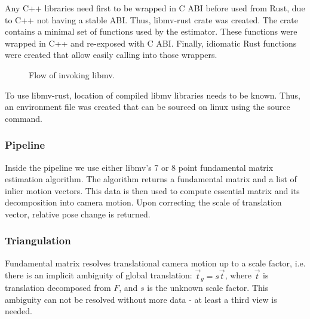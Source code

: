 \documentclass[11pt,english]{report}
\begin{document}
Any C++ libraries need first to be wrapped in C ABI before used from Rust, due to C++ not having a stable ABI. Thus, libmv-rust crate was created. The crate contains a minimal set of functions used by the estimator. These functions were wrapped in C++ and re-exposed with C ABI. Finally, idiomatic Rust functions were created that allow easily calling into those wrappers.

\begin{figure}[!ht]
	\centering
	\caption{\centering Flow of invoking libmv.}
\end{figure}

To use libmv-rust, location of compiled libmv libraries needs to be known. Thus, an environment file was created that can be sourced on linux using the source command.

\subsubsection{Pipeline}

Inside the pipeline we use either libmv's 7 or 8 point fundamental matrix estimation algorithm. The algorithm returns a fundamental matrix and a list of inlier motion vectors. This data is then used to compute essential matrix and its decomposition into camera motion. Upon correcting the scale of translation vector, relative pose change is returned.

\subsubsection{Triangulation}

Fundamental matrix resolves translational camera motion up to a scale factor, i.e. there is an implicit ambiguity\cite{hartley_zisserman_2004} of global translation: $\overrightarrow{t}_g = s\overrightarrow{t}$, where $\overrightarrow{t}$ is translation decomposed from $F$, and $s$ is the unknown scale factor. This ambiguity can not be resolved without more data - at least a third view is needed.
\end{document}
